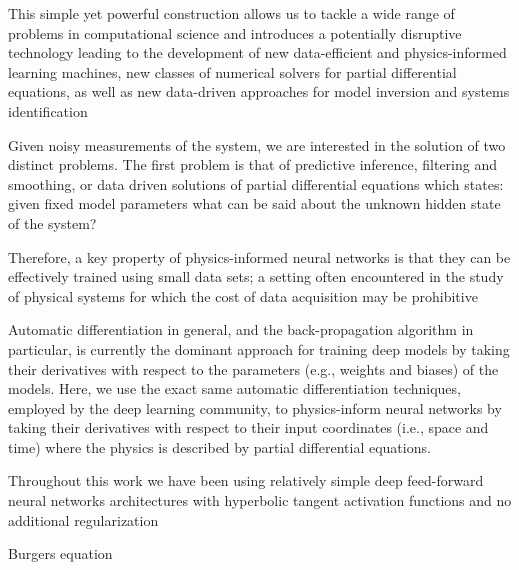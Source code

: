 This simple yet powerful construction allows us to tackle a wide range of problems in computational science and introduces a potentially disruptive technology leading to the development of new data-efficient and physics-informed learning machines, new classes of numerical solvers for partial differential equations, as well as new data-driven approaches for model inversion and systems identification

Given noisy measurements of the system, we are interested in the solution of two distinct problems. The first problem is that of predictive inference, filtering and smoothing, or data driven solutions of partial differential equations which states: given fixed model parameters  what can be said about the unknown hidden state of the system?



Therefore, a key property of physics-informed neural networks is that they can be effectively trained using small data sets; a setting often encountered in the study of physical systems for which the cost of data acquisition may be prohibitive

Automatic differentiation in general, and the back-propagation algorithm in particular, is currently the dominant approach for training deep models by taking their derivatives with respect to the parameters (e.g., weights and biases) of the models. Here, we use the exact same automatic differentiation techniques, employed by the deep learning community, to physics-inform neural networks by taking their derivatives with respect to their input coordinates (i.e., space and time) where the physics is described by partial differential equations.

Throughout this work we have been using relatively simple deep feed-forward neural networks architectures with hyperbolic tangent activation functions and no additional regularization

Burgers equation